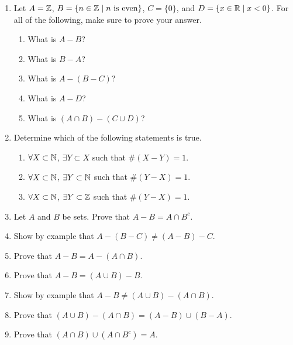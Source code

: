 \probsec{~\ref{sec:compl-set-diff}}
\begin{enumerate}
    \item Let $A = \mathbb{Z}$, $B = \{n \in \mathbb{Z} \mid n \text{ is even}\}$, $C = \{0\}$, and $D = \{x \in \mathbb{R} \mid x <0\}$. For all of the following, make sure to prove your answer.
  \begin{enumerate}
      \item What is $A - B$?
      \item What is $B - A$?
      \item What is $A - (B - C)$?
      \item What is $A - D$?
      \item What is $(A \cap B) - (C \cup D)$?
  \end{enumerate}

    \item Determine which of the following statements is true.
  \begin{enumerate}
      \item $\forall X \subset \mathbb{N}$, $\exists Y \subset X$ such that $\# (X - Y) = 1$.
      \item $\forall X \subset \mathbb{N}$, $\exists Y \subset \mathbb{N}$ such that $\# (Y - X) = 1$.
      \item $\forall X \subset \mathbb{N}$, $\exists Y \subset \mathbb{Z}$ such that $\# (Y - X) = 1$.
  \end{enumerate}

    \item Let $A$ and $B$ be sets. Prove that $A - B = A \cap B^c$.

    \item Show by example that $A - (B - C) \neq (A - B) - C$.

    \item Prove that $A - B = A - (A \cap B)$.

    \item Prove that $A - B = (A \cup B) - B$.

    \item Show by example that $A - B \neq (A \cup B) - (A \cap B)$.

    \item Prove that $(A \cup B) - (A \cap B) = (A - B) \cup (B - A)$.

    \item Prove that $(A \cap B) \cup (A \cap B^c) = A$.


\end{enumerate}
